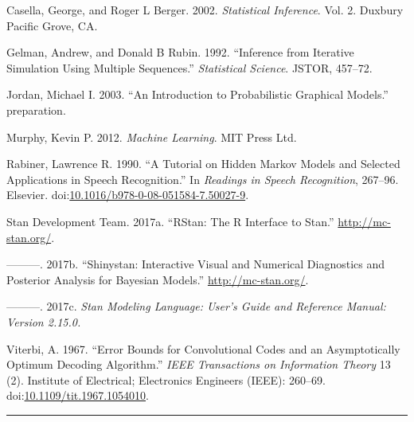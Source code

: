 \documentclass[]{article}
\begin{document}
\hypertarget{ref-casella2002statistical}{}
Casella, George, and Roger L Berger. 2002. \emph{Statistical Inference}.
Vol. 2. Duxbury Pacific Grove, CA.

\hypertarget{ref-gelman1992inference}{}
Gelman, Andrew, and Donald B Rubin. 1992. ``Inference from Iterative
Simulation Using Multiple Sequences.'' \emph{Statistical Science}.
JSTOR, 457--72.

\hypertarget{ref-jordan2003introduction}{}
Jordan, Michael I. 2003. ``An Introduction to Probabilistic Graphical
Models.'' preparation.

\hypertarget{ref-murphy2012machine}{}
Murphy, Kevin P. 2012. \emph{Machine Learning}. MIT Press Ltd.

\hypertarget{ref-rabiner1990tutorial}{}
Rabiner, Lawrence R. 1990. ``A Tutorial on Hidden Markov Models and
Selected Applications in Speech Recognition.'' In \emph{Readings in
Speech Recognition}, 267--96. Elsevier.
doi:\href{https://doi.org/10.1016/b978-0-08-051584-7.50027-9}{10.1016/b978-0-08-051584-7.50027-9}.

\hypertarget{ref-sdt2017rstan}{}
Stan Development Team. 2017a. ``RStan: The R Interface to Stan.''
\url{http://mc-stan.org/}.

\hypertarget{ref-sdt2017shinystan}{}
---------. 2017b. ``Shinystan: Interactive Visual and Numerical
Diagnostics and Posterior Analysis for Bayesian Models.''
\url{http://mc-stan.org/}.

\hypertarget{ref-team2017stan}{}
---------. 2017c. \emph{Stan Modeling Language: User's Guide and
Reference Manual: Version 2.15.0.}

\hypertarget{ref-viterbi1967error}{}
Viterbi, A. 1967. ``Error Bounds for Convolutional Codes and an
Asymptotically Optimum Decoding Algorithm.'' \emph{IEEE Transactions on
Information Theory} 13 (2). Institute of Electrical; Electronics
Engineers (IEEE): 260--69.
doi:\href{https://doi.org/10.1109/tit.1967.1054010}{10.1109/tit.1967.1054010}.

\begin{center}\rule{0.5\linewidth}{\linethickness}\end{center}
\end{document}
